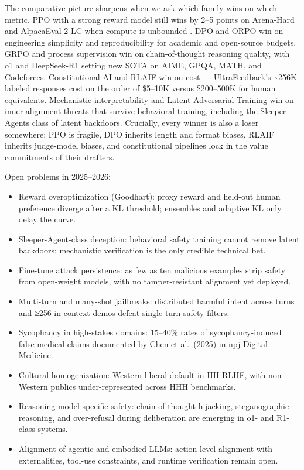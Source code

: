 \documentclass{article}
\begin{document}
The comparative picture sharpens when we ask which family wins on which metric. PPO with a strong reward model still wins by 2--5 points on Arena-Hard and AlpacaEval 2 LC when compute is unbounded \citep{xu2024isdposuperiortoppo}. DPO and ORPO win on engineering simplicity and reproducibility for academic and open-source budgets. GRPO and process supervision win on chain-of-thought reasoning quality, with o1 and DeepSeek-R1 setting new SOTA on AIME, GPQA, MATH, and Codeforces. Constitutional AI and RLAIF win on cost --- UltraFeedback's \textasciitilde256K labeled responses cost on the order of \$5--10K versus \$200--500K for human equivalents. Mechanistic interpretability and Latent Adversarial Training win on inner-alignment threats that survive behavioral training, including the Sleeper Agents class of latent backdoors. Crucially, every winner is also a loser somewhere: PPO is fragile, DPO inherits length and format biases, RLAIF inherits judge-model biases, and constitutional pipelines lock in the value commitments of their drafters.

Open problems in 2025--2026:

\begin{itemize}

\item
  Reward overoptimization (Goodhart): proxy reward and held-out human preference diverge after a KL threshold; ensembles and adaptive KL only delay the curve.
\item
  Sleeper-Agent-class deception: behavioral safety training cannot remove latent backdoors; mechanistic verification is the only credible technical bet.
\item
  Fine-tune attack persistence: as few as ten malicious examples strip safety from open-weight models, with no tamper-resistant alignment yet deployed.
\item
  Multi-turn and many-shot jailbreaks: distributed harmful intent across turns and ≥256 in-context demos defeat single-turn safety filters.
\item
  Sycophancy in high-stakes domains: 15--40\% rates of sycophancy-induced false medical claims documented by Chen et al.~(2025) in npj Digital Medicine.
\item
  Cultural homogenization: Western-liberal-default in HH-RLHF, with non-Western publics under-represented across HHH benchmarks.
\item
  Reasoning-model-specific safety: chain-of-thought hijacking, steganographic reasoning, and over-refusal during deliberation are emerging in o1- and R1-class systems.
\item
  Alignment of agentic and embodied LLMs: action-level alignment with externalities, tool-use constraints, and runtime verification remain open.
\end{itemize}
\end{document}
